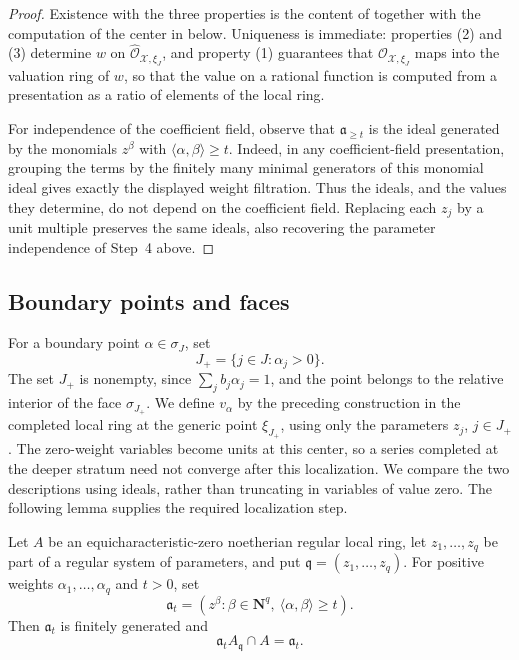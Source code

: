 \begin{proof}
Existence with the three properties is the content of
 together with the computation of the center
in  below. Uniqueness is immediate:
properties (2) and (3) determine $w$ on
$\widehat{\mathcal O}_{\mathcal X,\xi_J}$, and property (1) guarantees
that $\mathcal O_{\mathcal X,\xi_J}$ maps into the valuation ring of
$w$, so that the value on a rational function is computed from a
presentation as a ratio of elements of the local ring.

For independence of the coefficient field, observe that
$\mathfrak a_{\ge t}$ is the ideal generated by the monomials $z^\beta$
with $\langle\alpha,\beta\rangle\ge t$. Indeed, in any coefficient-field
presentation, grouping the terms by the finitely many minimal generators
of this monomial ideal gives exactly the displayed weight filtration.
Thus the ideals, and the values they determine, do not depend on the
coefficient field. Replacing each $z_j$ by a unit multiple preserves the
same ideals, also recovering the parameter independence of Step~4 above.
\end{proof}

\subsection{Boundary points and faces}

For a boundary point $\alpha\in\sigma_J$, set
\[
                         J_+=\{j\in J:\alpha_j>0\}.
\]
The set $J_+$ is nonempty, since $\sum_jb_j\alpha_j=1$, and the point
belongs to the relative interior of the face
$\sigma_{J_+}$. We define $v_\alpha$ by the preceding construction in
the completed local ring at the generic point $\xi_{J_+}$, using only the
parameters $z_j$, $j\in J_+$. The zero-weight variables become units at
this center, so a series completed at the deeper stratum need not converge
after this localization. We compare the two descriptions using ideals,
rather than truncating in variables of value zero. The following lemma
supplies the required localization step.

\begin{lemma}
\label{lem:snc-weighted-ideal-localization}
Let $A$ be an equicharacteristic-zero noetherian regular local ring, let
$z_1,\ldots,z_q$ be part of a regular system of parameters, and put
$\mathfrak q=(z_1,\ldots,z_q)$. For positive weights
$\alpha_1,\ldots,\alpha_q$ and $t>0$, set
\[
 \mathfrak a_t=(z^\beta:\beta\in\mathbf N^q,\
                         \langle\alpha,\beta\rangle\ge t).
\]
Then $\mathfrak a_t$ is finitely generated and
\[
                  \mathfrak a_tA_{\mathfrak q}\cap A=\mathfrak a_t.
\]
\end{lemma}

